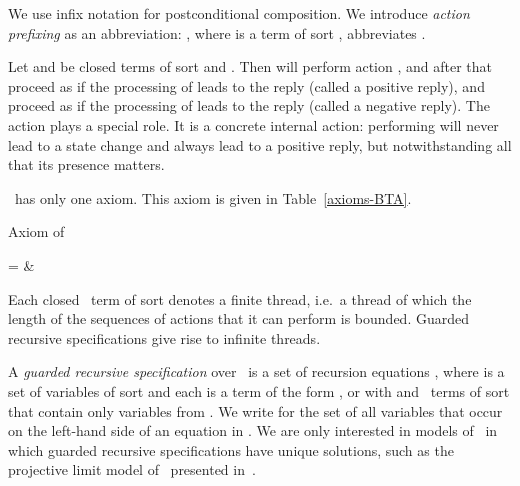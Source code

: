 \documentclass[fleqn]{llncs}
\begin{document}
We use infix notation for postconditional composition.
We introduce \emph{action prefixing} as an abbreviation:
, where  is a term of sort , abbreviates
.

Let  and  be closed terms of sort  and
.
Then  will perform action , and after that
proceed as  if the processing of  leads to the reply 
(called a positive reply), and proceed as  if the processing of
 leads to the reply  (called a negative reply).
The action  plays a special role.
It is a concrete internal action: performing  will never lead to a
state change and always lead to a positive reply, but notwithstanding
all that its presence matters.

\BTA\ has only one axiom.
This axiom is given in Table~\ref{axioms-BTA}.\begin{table}[!t]
\caption{Axiom of \BTA}
\label{axioms-BTA}
\begin{eqntbl}
\begin{axcol}
 =                       & 
\end{axcol}
\end{eqntbl}
\end{table}

Each closed \BTA\ term of sort  denotes a finite thread, i.e.\ a
thread of which the length of the sequences of actions that it can
perform is bounded.
Guarded recursive specifications give rise to infinite threads.

A \emph{guarded recursive specification} over \BTA\ is a set of
recursion equations , where  is a
set of variables of sort  and each  is a term of the form
,  or  with  and  \BTA\ terms
of sort  that contain only variables from .
We write  for the set of all variables that occur on the
left-hand side of an equation in .
We are only interested in models of \BTA\ in which guarded recursive
specifications have unique solutions, such as the projective limit model
of \BTA\ presented in~\cite{BB03a}.
\end{document}
